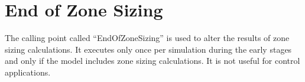 \section{End of Zone Sizing}\label{end-of-zone-sizing}

The calling point called ``EndOfZoneSizing'' is used to alter the results of zone sizing calculations. It executes only once per simulation during the early stages and only if the model includes zone sizing calculations. It is not useful for control applications.
